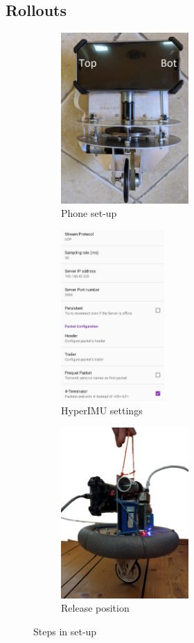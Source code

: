 \documentclass[twoside,twocolumn,12pt]{article}
\begin{document}
\subsection{Rollouts}
\begin{figure}[t]
  \centering
  \begin{subfigure}[t]{0.325\textwidth}
  \centering
    \includegraphics[height = 6.5cm]{front_lab}
   \caption{Phone set-up}
  \label{fig:set_up}
  \end{subfigure}
  \begin{subfigure}[t]{0.325\textwidth}
  \centering
    \includegraphics[height = 6.5cm]{hyperimu}
    \caption{HyperIMU settings}
  \label{fig:imuset}
  \end{subfigure}
  \begin{subfigure}[t]{0.325\textwidth}
  \centering
    \includegraphics[height = 6.5cm]{relt}
    \caption{Release position}
  \label{fig:unirel}
  \end{subfigure}
  \caption{Steps in set-up}
  \label{fig:set_up_steps}
\end{figure}
\end{document}
